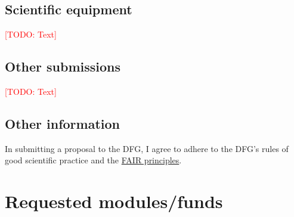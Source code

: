 \documentclass[american,firsttime]{dfgproposal}
\newcommand{\todo}[1]{\xspace{\textcolor{red}{[TODO: #1]}}\xspace}
\begin{document}
	\subsection{Scientific equipment}
	\todo{Text}
	
	\subsection{Other submissions}
	\todo{Text}
	
	
	
	\subsection{Other information}
	In submitting a proposal to the DFG, I agree to adhere to the DFG's rules of good scientific practice and the \href{https://www.nature.com/articles/sdata201618}{FAIR principles}.
	
	
	\section{Requested modules/funds}
	
\end{document}

